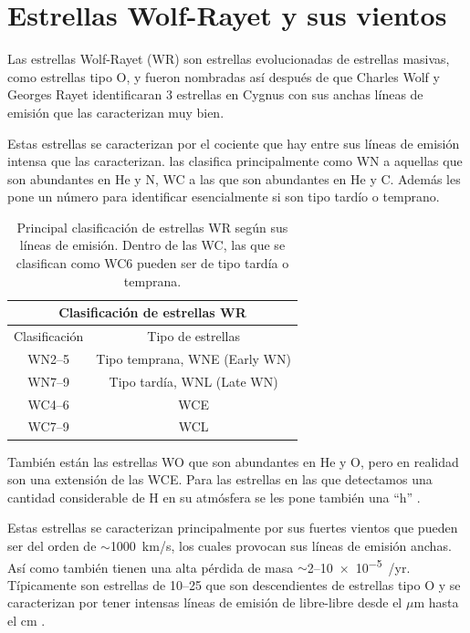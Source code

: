 \documentclass{book}
\begin{document}
\section{Estrellas Wolf-Rayet y sus vientos}

Las estrellas Wolf-Rayet (WR) son estrellas evolucionadas de estrellas masivas, como estrellas tipo O, y fueron nombradas así después de que Charles Wolf y Georges Rayet identificaran 3 estrellas en Cygnus con sus  anchas líneas de emisión que las caracterizan muy bien. 

Estas estrellas se caracterizan por el cociente que hay entre sus líneas de emisión intensa que las caracterizan. \cite{Smith:1968} las clasifica principalmente como WN a aquellas que son abundantes en He y N, WC a las que son abundantes en He y C. Además les pone un número para identificar esencialmente si son tipo tardío o temprano.

\begin{table}[h!]
    \begin{center}
        \begin{tabular}{c c}
        \toprule
        \multicolumn{2}{c}{Clasificación de estrellas WR} \\ \midrule
        Clasificación    & Tipo de estrellas\\ \midrule
        WN2--5     & Tipo temprana, WNE (Early WN)\\
        WN7--9 & Tipo tardía, WNL (Late WN) \\
        WC4--6 & WCE\\
        WC7--9 & WCL \\ \bottomrule
        \end{tabular}
    \caption{Principal clasificación de estrellas WR  según sus líneas de emisión. Dentro de las WC, las que se clasifican como WC6 pueden ser de tipo tardía o temprana.}
    \label{tab:WR-clasificacion}
    \end{center}
\end{table}

También están las estrellas WO que son abundantes en He y O, pero en realidad son una extensión de las WCE. Para las estrellas en las que detectamos una cantidad considerable de H en su atmósfera se les pone también una ``h'' \citep{SSM:1996}.

Estas estrellas se caracterizan principalmente por sus fuertes vientos que pueden ser del orden de $\sim$\SI{1000}{km/s}, los cuales provocan sus líneas de emisión anchas. Así como también tienen una alta pérdida de masa $\sim$2--\SI{10e-5}{\msun/yr}. Típicamente son estrellas de 10--\SI{25}{\msun} que son descendientes de estrellas tipo O y se caracterizan por tener intensas líneas de emisión de libre-libre desde el $\mu$m hasta el cm \citep{crowther:2007}.
\end{document}
